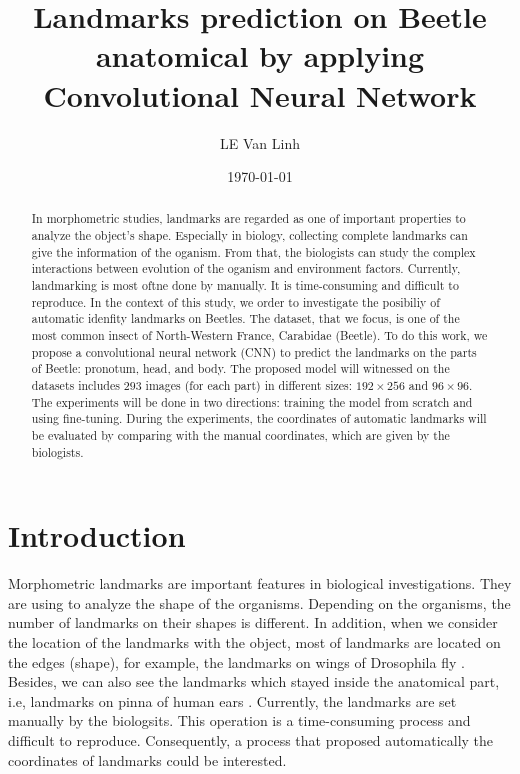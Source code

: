 \documentclass[12pt,a4paper]{article}
\begin{document}
\title{Landmarks prediction on Beetle anatomical by applying Convolutional Neural Network }
\author{LE Van Linh}
\date{\today}
\maketitle
\begin{abstract}
	In morphometric studies, landmarks are regarded as one of important properties to analyze the object's shape. Especially in biology, collecting complete landmarks can give the information of the oganism. From that, the biologists can study the complex interactions between evolution of the oganism and environment factors. Currently, landmarking is most oftne done by manually. It is time-consuming and difficult to reproduce. In the context of this study, we order to investigate the posibiliy of automatic idenfity landmarks on Beetles. The dataset, that we focus, is one of the most common insect of North-Western France, Carabidae (Beetle). To do this work, we propose a convolutional neural network (CNN) to predict the landmarks on the parts of Beetle: pronotum, head, and body. The proposed model will witnessed on the datasets includes $293$ images (for each part) in different sizes: $192 \times 256$ and $96 \times 96$. The experiments will be done in two directions: training the model from scratch and using fine-tuning. During the experiments, the coordinates of automatic landmarks will be evaluated by comparing with the manual coordinates, which are given by the biologists.
\end{abstract}
\section{Introduction}
Morphometric landmarks are important features in biological investigations. They are using to analyze the shape of the organisms. Depending on the organisms, the number of landmarks on their shapes is different. In addition, when we consider the location of the landmarks with the object, most of landmarks are located on the edges (shape), for example, the landmarks on wings of Drosophila fly \cite{sonnenschein2015image}. Besides, we can also see the landmarks which stayed inside the anatomical part, i.e, landmarks on pinna of human ears \cite{cintas2016automatic}. Currently, the landmarks are set manually by the biologsits. This operation is a time-consuming process and difficult to reproduce. Consequently, a process that proposed automatically the coordinates of landmarks could be interested.
\end{document}
